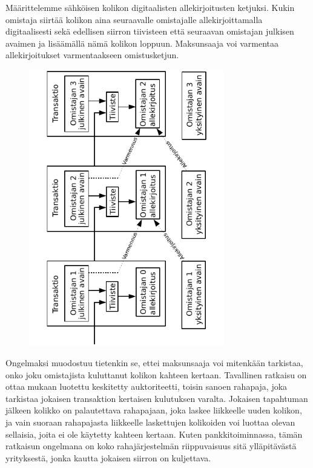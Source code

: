 \documentclass{article}
\begin{document}
Määrittelemme sähköisen kolikon digitaalisten allekirjoitusten ketjuksi. Kukin omistaja siirtää kolikon aina seuraavalle omistajalle allekirjoittamalla digitaalisesti sekä edellisen siirron tiivisteen että seuraavan omistajan julkisen avaimen ja lisäämällä nämä kolikon loppuun. Maksunsaaja voi varmentaa allekirjoitukset varmentaakseen omistusketjun.

\begin{figure}[H]
    \centering
    \includegraphics[angle=270,width=8.5cm]{figures/fig1.pdf}
\end{figure}

Ongelmaksi muodostuu tietenkin se, ettei maksunsaaja voi mitenkään tarkistaa, onko joku omistajista kuluttanut kolikon kahteen kertaan. Tavallinen ratkaisu on ottaa mukaan luotettu keskitetty auktoriteetti, toisin sanoen rahapaja, joka tarkistaa jokaisen transaktion kertaisen kulutuksen varalta. Jokaisen tapahtuman jälkeen kolikko on palautettava rahapajaan, joka laskee liikkeelle uuden kolikon, ja vain suoraan rahapajasta liikkeelle laskettujen kolikoiden voi luottaa olevan sellaisia, joita ei ole käytetty kahteen kertaan. Kuten pankkitoiminnassa, tämän ratkaisun ongelmana on koko rahajärjestelmän riippuvaisuus sitä ylläpitävästä yrityksestä, jonka kautta jokaisen siirron on kuljettava.
\end{document}
